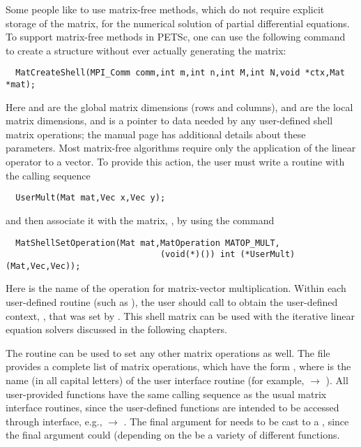 \label{sec:matrixfree}
Some people like to use matrix-free methods, which do not require
explicit storage of the matrix, for the numerical solution of partial
differential equations.  To support matrix-free methods in PETSc, one
can use the following command to create a  structure without
ever actually generating the matrix:
\begin{verbatim}
  MatCreateShell(MPI_Comm comm,int m,int n,int M,int N,void *ctx,Mat *mat);
\end{verbatim}
Here  and  are the global matrix dimensions (rows and
columns),  and  are the local matrix dimensions, and
 is a pointer to data needed by any user-defined shell matrix
operations; the manual page has additional details about these
parameters.  Most matrix-free algorithms require only the application
of the linear operator to a vector. To provide this action, the user
must write a routine with the calling sequence
\begin{verbatim}
  UserMult(Mat mat,Vec x,Vec y);
\end{verbatim}
and then associate it with the matrix, , by using the 
command 
\begin{verbatim}
  MatShellSetOperation(Mat mat,MatOperation MATOP_MULT,
                               (void(*)()) int (*UserMult)(Mat,Vec,Vec));
\end{verbatim}
Here  is the name of the operation for matrix-vector
multiplication. Within each user-defined routine (such as
), the user should call 
 to obtain the user-defined context, ,
that was set by .
This shell matrix can be used with the iterative linear
equation solvers discussed in the following chapters.

The routine  can be used to set any other
matrix operations as well.  The file 
 provides a complete list of matrix
operations, which have the form , where  is the name (in all capital letters) of the user
interface routine (for example,  $ \rightarrow $ ).  All
user-provided functions have the same calling sequence as the
usual matrix interface routines, since the user-defined functions are
intended to be accessed through interface, e.g., 
 $ \rightarrow$ .
The final argument for  needs to be cast
to a , since the final argument could (depending on the 
 be a variety of different functions.

